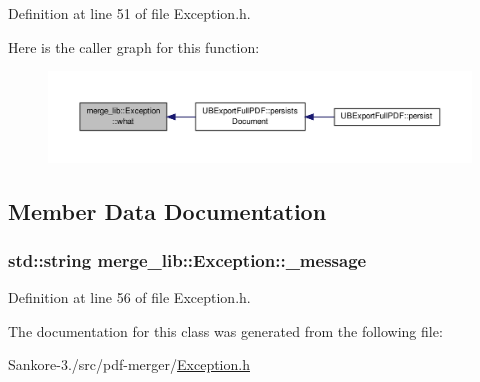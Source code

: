 Definition at line 51 of file Exception.\-h.



Here is the caller graph for this function\-:
\nopagebreak
\begin{figure}[H]
\begin{center}
\leavevmode
\includegraphics[width=350pt]{d7/d2b/classmerge__lib_1_1_exception_ae9118923f240ca36a10e2536362819e1_icgraph}
\end{center}
\end{figure}




\subsection{Member Data Documentation}
\hypertarget{classmerge__lib_1_1_exception_afa5f51138fd5bb6da956b25becdbe92d}{
\subsubsection[{\-\_\-message}]{\setlength{\rightskip}{0pt plus 5cm}std\-::string merge\-\_\-lib\-::\-Exception\-::\-\_\-message\hspace{0.3cm}{\ttfamily [protected]}}}\label{d7/d2b/classmerge__lib_1_1_exception_afa5f51138fd5bb6da956b25becdbe92d}


Definition at line 56 of file Exception.\-h.



The documentation for this class was generated from the following file\-:\begin{DoxyCompactItemize}
\item 
Sankore-\/3./src/pdf-\/merger/\hyperlink{_exception_8h}{Exception.\-h}\end{DoxyCompactItemize}

